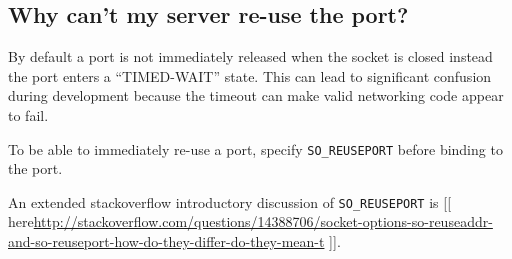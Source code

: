 \begin{Shaded}
\begin{Highlighting}[]
{{{     \NormalTok{buffer[}\NormalTok{];}
     \NormalTok{);}

    \StringTok{"Read %d chars}\CharTok{\textbackslash{}n}\StringTok{"}\NormalTok{, len);}
    \NormalTok{printf(}\StringTok{"===}\CharTok{\textbackslash{}n}\StringTok{"}\NormalTok{);}
    \NormalTok{printf(}\StringTok{"%s}\CharTok{\textbackslash{}n}\StringTok{"}\NormalTok{, buffer);}

    \KeywordTok{return} \DecValTok{0}\NormalTok{;}
\NormalTok{\}}
\end{Highlighting}
\end{Shaded}

\subsection{Why can't my server re-use the
port?}\label{why-cant-my-server-re-use-the-port}

By default a port is not immediately released when the socket is closed
instead the port enters a ``TIMED-WAIT'' state. This can lead to
significant confusion during development because the timeout can make
valid networking code appear to fail.

To be able to immediately re-use a port, specify \texttt{SO\_REUSEPORT}
before binding to the port.

\begin{Shaded}
\begin{Highlighting}[]
 \NormalTok{;}

\end{Highlighting}
\end{Shaded}

An extended stackoverflow introductory discussion of
\texttt{SO\_REUSEPORT} is {[}{[}
here\textbar{}\url{http://stackoverflow.com/questions/14388706/socket-options-so-reuseaddr-and-so-reuseport-how-do-they-differ-do-they-mean-t}
{]}{]}.

